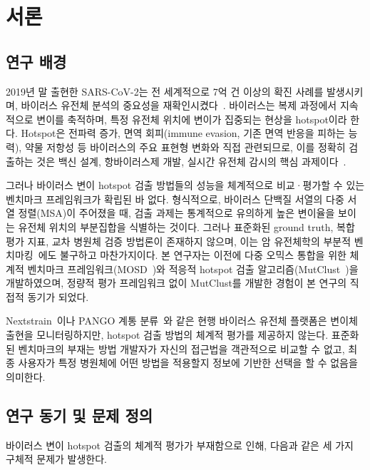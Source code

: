 \chapter{서론}
\label{ch:introduction}

\section{연구 배경}
\label{sec:intro_background}

2019년 말 출현한 SARS-CoV-2는 전 세계적으로 7억 건 이상의 확진 사례를 발생시키며, 바이러스 유전체 분석의 중요성을 재확인시켰다~\cite{harvey2021tracking}.
바이러스는 복제 과정에서 지속적으로 변이를 축적하며, 특정 유전체 위치에 변이가 집중되는 현상을 hotspot이라 한다.
Hotspot은 전파력 증가, 면역 회피(immune evasion, 기존 면역 반응을 피하는 능력), 약물 저항성 등 바이러스의 주요 표현형 변화와 직접 관련되므로, 이를 정확히 검출하는 것은 백신 설계, 항바이러스제 개발, 실시간 유전체 감시의 핵심 과제이다~\cite{youn2025mutclust,nextstrain2018hadfield,rambaut2020pangolin}.

그러나 바이러스 변이 hotspot 검출 방법들의 성능을 체계적으로 비교·평가할 수 있는 벤치마크 프레임워크가 확립된 바 없다. 형식적으로, 바이러스 단백질 서열의 다중 서열 정렬(MSA)이 주어졌을 때, 검출 과제는 통계적으로 유의하게 높은 변이율을 보이는 유전체 위치의 부분집합을 식별하는 것이다. 그러나 표준화된 ground truth, 복합 평가 지표, 교차 병원체 검증 방법론이 존재하지 않으며, 이는 암 유전체학의 부분적 벤치마킹~\cite{bailey2018comprehensive}에도 불구하고 마찬가지이다.
본 연구자는 이전에 다중 오믹스 통합을 위한 체계적 벤치마크 프레임워크(MOSD~\cite{han2025mosd})와 적응적 hotspot 검출 알고리즘(MutClust~\cite{youn2025mutclust})을 개발하였으며, 정량적 평가 프레임워크 없이 MutClust를 개발한 경험이 본 연구의 직접적 동기가 되었다.

Nextstrain~\cite{nextstrain2018hadfield}이나 PANGO 계통 분류~\cite{rambaut2020pangolin}와 같은 현행 바이러스 유전체 플랫폼은 변이체 출현을 모니터링하지만, hotspot 검출 방법의 체계적 평가를 제공하지 않는다.
표준화된 벤치마크의 부재는 방법 개발자가 자신의 접근법을 객관적으로 비교할 수 없고, 최종 사용자가 특정 병원체에 어떤 방법을 적용할지 정보에 기반한 선택을 할 수 없음을 의미한다.


\section{연구 동기 및 문제 정의}
\label{sec:intro_motivation}

바이러스 변이 hotspot 검출의 체계적 평가가 부재함으로 인해, 다음과 같은 세 가지 구체적 문제가 발생한다.

